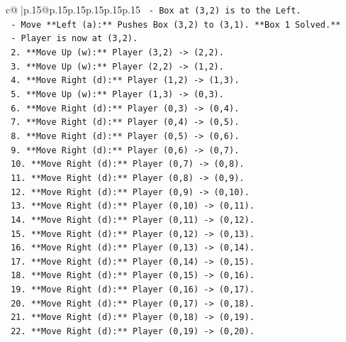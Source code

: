 \documentclass{article}
\begin{document}
{\begin{supertabular}{c@{$\;$}|p{.15\linewidth}@{}p{.15\linewidth}p{.15\linewidth}p{.15\linewidth}p{.15\linewidth}p{.15\linewidth}}
{{{\texttt{            {-} Box at (3,2) is to the Left.} \\
\texttt{            {-} Move **Left (a):** Pushes Box (3,2) to (3,1). **Box 1 Solved.**} \\
\texttt{            {-} Player is now at (3,2).} \\
\texttt{        2.  **Move Up (w):** Player (3,2) {-}> (2,2).} \\
\texttt{        3.  **Move Up (w):** Player (2,2) {-}> (1,2).} \\
\texttt{        4.  **Move Right (d):** Player (1,2) {-}> (1,3).} \\
\texttt{        5.  **Move Up (w):** Player (1,3) {-}> (0,3).} \\
\texttt{        6.  **Move Right (d):** Player (0,3) {-}> (0,4).} \\
\texttt{        7.  **Move Right (d):** Player (0,4) {-}> (0,5).} \\
\texttt{        8.  **Move Right (d):** Player (0,5) {-}> (0,6).} \\
\texttt{        9.  **Move Right (d):** Player (0,6) {-}> (0,7).} \\
\texttt{        10. **Move Right (d):** Player (0,7) {-}> (0,8).} \\
\texttt{        11. **Move Right (d):** Player (0,8) {-}> (0,9).} \\
\texttt{        12. **Move Right (d):** Player (0,9) {-}> (0,10).} \\
\texttt{        13. **Move Right (d):** Player (0,10) {-}> (0,11).} \\
\texttt{        14. **Move Right (d):** Player (0,11) {-}> (0,12).} \\
\texttt{        15. **Move Right (d):** Player (0,12) {-}> (0,13).} \\
\texttt{        16. **Move Right (d):** Player (0,13) {-}> (0,14).} \\
\texttt{        17. **Move Right (d):** Player (0,14) {-}> (0,15).} \\
\texttt{        18. **Move Right (d):** Player (0,15) {-}> (0,16).} \\
\texttt{        19. **Move Right (d):** Player (0,16) {-}> (0,17).} \\
\texttt{        20. **Move Right (d):** Player (0,17) {-}> (0,18).} \\
\texttt{        21. **Move Right (d):** Player (0,18) {-}> (0,19).} \\
\texttt{        22. **Move Right (d):** Player (0,19) {-}> (0,20).} \\
}}}
\end{supertabular}}
\end{document}
